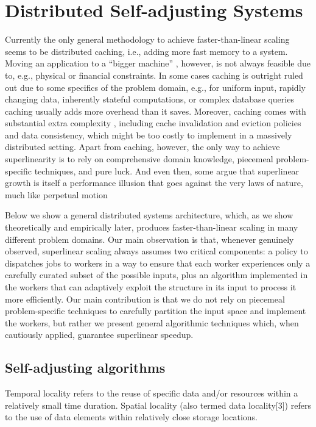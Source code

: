 \section{Distributed Self-adjusting Systems}
\label{sec:architecture}

Currently the only general methodology to achieve faster-than-linear scaling seems to be distributed caching, i.e., adding more fast memory to a system. Moving an application to a ``bigger machine'' \cite{dobb-2}, however, is not always feasible due to, e.g., physical or financial constraints.  In some cases caching is outright ruled out due to some specifics of the problem domain, e.g., for uniform input, rapidly changing data, inherently stateful computations, or complex database queries caching usually adds more overhead than it saves. Moreover, caching comes with substantial extra complexity \cite{271208}, including cache invalidation and eviction policies and data consistency, which might be too costly to implement in a massively distributed setting. Apart from caching, however, the only way to achieve superlinearity is to rely on comprehensive domain knowledge, piecemeal problem-specific techniques, and pure luck. And even then, some argue that superlinear growth is itself a performance illusion that goes against the very laws of nature, much like perpetual motion \cite{gunther-hotsos, 10.1145/2773212.2789974}

Below we show a general distributed systems architecture, which, as we show theoretically and empirically later, produces faster-than-linear scaling in many different problem domains. Our main observation is that, whenever genuinely observed, superlinear scaling always assumes two critical components: a policy to dispatches jobs to workers in a way to ensure that each worker experiences only a carefully curated subset of the possible inputs, plus an algorithm implemented in the workers that can adaptively exploit the structure in its input to process it more efficiently. Our main contribution is that we do not rely on piecemeal problem-specific techniques to carefully partition the input space and implement the workers, but rather we present general algorithmic techniques which, when cautiously applied, guarantee superlinear speedup.

\subsection{Self-adjusting algorithms}
\label{sec:sa-alg}

Temporal locality refers to the reuse of specific data and/or resources within a relatively small time duration. Spatial locality (also termed data locality[3]) refers to the use of data elements within relatively close storage locations.


